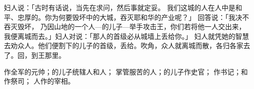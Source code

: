 {妇人说：「古时有话说，当先在{}求问，然后事就定妥。
我们这城的人在{}人中是和平、忠厚的。你为何要毁坏{}中的大城，吞灭耶和华的产业呢？」
回答说：「我决不吞灭毁坏，
乃因{}山地的一个人—{}的儿子{}—举手攻击{}王，你们若将他一人交出来，我便离城而去。」妇人对{}说：「那人的首级必从城墙上丢给你。」
妇人就凭她的智慧去劝众人。他们便割下{}的儿子{}的首级，丢给{}。{}吹角，众人就离城而散，各归各家去了。{}回{}，到王那里。
\par }{\PP {}作{}全军的元帅；{}的儿子{}统辖{}人和{}人；
掌管服苦的人；{}的儿子{}作史官；
作书记；{}和{}作祭司{}；
人{}作{}的宰相。

}
